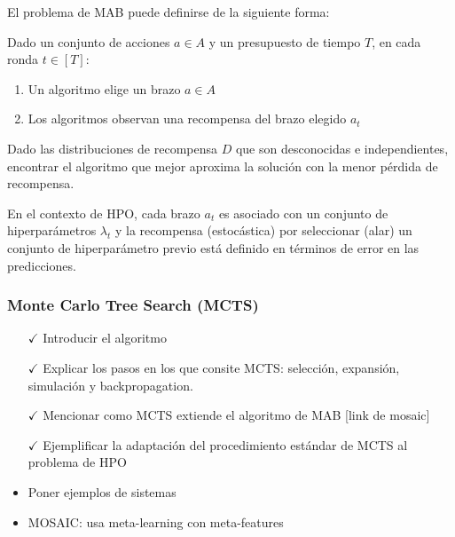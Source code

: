 El problema de MAB puede definirse de la siguiente forma:

Dado un conjunto de acciones $a \in A$ y un presupuesto de tiempo $T$, en cada ronda $t \in [T]$:

\begin{enumerate}
	\item Un algoritmo elige un brazo $a \in A$
	\item Los algoritmos observan una recompensa del brazo elegido $a_t$
\end{enumerate}

Dado las distribuciones de recompensa $D$ que son desconocidas e independientes, encontrar el algoritmo que mejor aproxima la solución con la menor pérdida de recompensa.

En el contexto de HPO, cada brazo $a_t$ es asociado con un conjunto de hiperparámetros $\lambda_t$ y la recompensa (estocástica) por seleccionar (alar) un conjunto de hiperparámetro previo está definido en términos de error en las predicciones.


\subsubsection{Monte Carlo Tree Search (MCTS)}


\begin{itemize}
	\item[$\checkmark$] Introducir el algoritmo
	\item[$\checkmark$] Explicar los pasos en los que consite MCTS: selección, expansión, simulación y backpropagation.
	\item[$\checkmark$] Mencionar como MCTS extiende el algoritmo de MAB [link de mosaic]
	\item[$\checkmark$] Ejemplificar la adaptación del procedimiento estándar de MCTS al problema de HPO 
	\item Poner ejemplos de sistemas
	\item MOSAIC: usa meta-learning con meta-features
\end{itemize}


